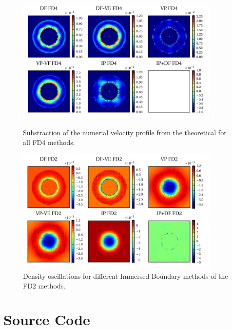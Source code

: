 \begin{figure}[!h]
  \includegraphics[width=0.9\textwidth]{gfx/immersed_boundary/tcflow/long/vz_profiles_o4.pdf}
  \caption{\label{tcflow:results_vprofiles_o4}
    Substraction of the numerial velocity profile from the theoretical
        for all FD4 methods.}
  \includegraphics[width=0.9\textwidth]{gfx/immersed_boundary/tcflow/long/rho_o2.pdf}
  \caption{Density oscillations for different Immersed Boundary methods of the FD2 methods.}
    \label{tcflow:results_rho_profiles_o2}
\end{figure}
\clearpage

\chapter{Source Code}

